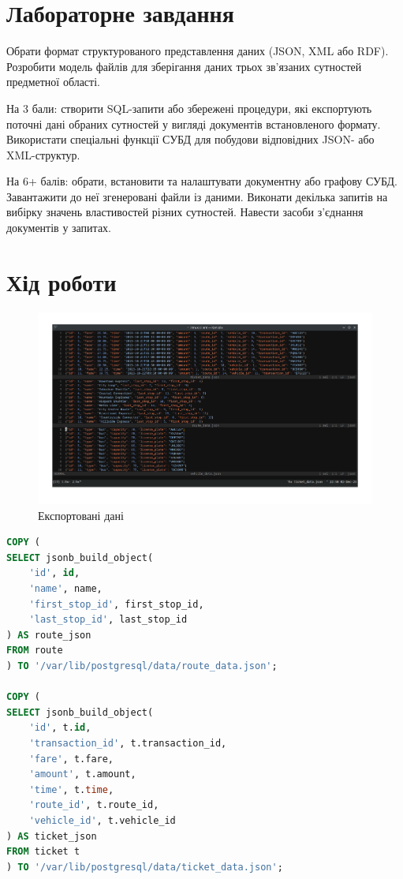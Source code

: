 \documentclass[14pt]{extreport}
\begin{document}
\begin{normalsize}
	\section*{Лабораторне завдання}
Обрати формат структурованого представлення даних (JSON, XML або RDF). Розробити модель файлів для зберігання даних трьох зв’язаних сутностей предметної області.

На 3 бали: створити SQL-запити або збережені процедури, які експортують поточні дані обраних сутностей у вигляді документів встановленого формату. Використати спеціальні функції СУБД для побудови відповідних JSON- або XML-структур. 

На 6+ балів: обрати, встановити та налаштувати документну або графову СУБД. Завантажити до неї згенеровані файли із даними. Виконати декілька запитів на вибірку значень властивостей різних сутностей. Навести засоби з’єднання документів у запитах.	
	
	\section*{Хід роботи}
	\begin{figure}[H]
		\centering
		\includegraphics[scale=0.45]{1}
		\caption{Експортовані дані}
	\end{figure}
	
	\begin{lstlisting}[language=sql]
COPY (
SELECT jsonb_build_object(
	'id', id,
	'name', name,
	'first_stop_id', first_stop_id,
	'last_stop_id', last_stop_id
) AS route_json
FROM route
) TO '/var/lib/postgresql/data/route_data.json';

COPY (
SELECT jsonb_build_object(
	'id', t.id,
	'transaction_id', t.transaction_id,
	'fare', t.fare,
	'amount', t.amount,
	'time', t.time,
	'route_id', t.route_id,
	'vehicle_id', t.vehicle_id
) AS ticket_json
FROM ticket t
) TO '/var/lib/postgresql/data/ticket_data.json';


\end{lstlisting}
\end{normalsize}
\end{document}
